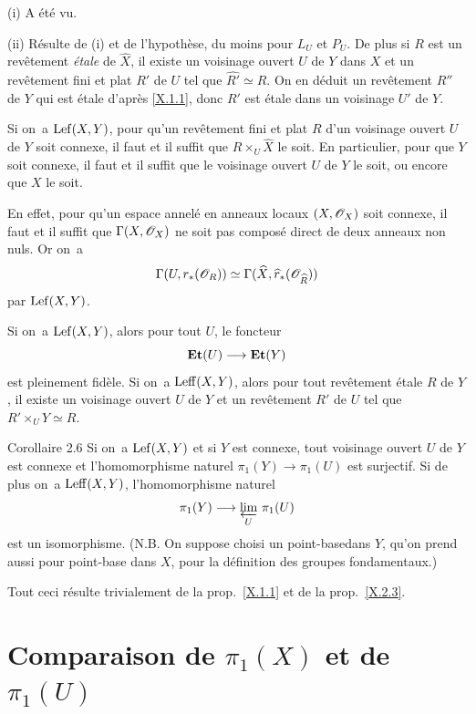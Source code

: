 (i) A \'et\'e vu.

(ii) R\'esulte de (i) et de l'hypoth\`ese, du moins pour $L_U$ et $P_U$. De plus si $R$ est un rev\^etement \emph{étale} de $\hat{X}$, il existe un voisinage ouvert $U$ de $Y$ dans $X$ et un rev\^etement fini et plat $R'$ de $U$ tel que $\widehat{R'} \simeq R$. On en d\'eduit un rev\^etement $R''$ de $Y$ qui est \'etale d'apr\`es \ref{X.1.1}, donc $R'$ est \'etale dans un voisinage $U'$ de $Y$. \cqfd

\begin{corollaire} \label{X.2.4}
Si on~a $\operatorname{Lef} (X, Y)$, pour qu'un rev\^etement fini et plat $R$ d'un voisinage ouvert $U$ de $Y$ soit connexe, il faut et il suffit que $R \times_U \hat{X}$ le soit. En particulier, pour que $Y$ soit connexe, il faut et il suffit que le voisinage ouvert $U$ de $Y$ le soit, ou encore que $X$ le soit.
\end{corollaire}

En effet, pour qu'un espace annel\'e en anneaux locaux $(X, \mathscr{O}_X)$ soit connexe, il faut et il suffit que $\Gamma(X, \mathscr{O}_X)$ ne soit pas compos\'e direct de deux anneaux non nuls. Or on~a
\[
\Gamma(U, r_\ast({\mathscr O}_R)) \simeq \Gamma(\widehat{X}, \widehat{r}_\ast({\mathscr O}_{\widehat{R}}))
\]
par $\operatorname{Lef}(X, Y)$.

\begin{corollaire} \label{X.2.5} Si on~a $\operatorname{Lef} (X, Y)$, alors pour tout $U$, le foncteur
\[
\Et(U) \to \Et(Y)
\]
est pleinement fid\`ele. Si on~a $\operatorname{Leff}(X, Y)$, alors pour tout rev\^etement \'etale $R$ de $Y$, il existe un voisinage ouvert $U$ de $Y$ et un rev\^etement $R'$ de $U$ tel que $R' \times_U Y \simeq R$.
\end{corollaire}

\label{X.2.6}
\begin{enonce*}{Corollaire 2.6\ndemark}
Si on~a $\operatorname{Lef}(X, Y)$ et si $Y$ est connexe, tout voisinage ouvert $U$ de $Y$ est connexe et l'homomorphisme naturel $\pi_1(Y)\to\pi_1(U)$ est surjectif. Si de plus on~a $\operatorname{Leff}(X, Y)$, l'homomorphisme naturel
\[
\pi_1(Y) \to \varprojlim_{U}\, \pi_1(U)
\]
est un isomorphisme. (N.B. On suppose choisi un \og point-base\fg dans $Y$, qu'on prend aussi pour point-base dans $X$, pour la d\'efinition des groupes fondamentaux.)
\end{enonce*}

Tout ceci r\'esulte trivialement de la prop.\, \ref{X.1.1} et de la prop.\, \ref{X.2.3}.


\section{Comparaison de $\pi_1(X)$ et de $\pi_1(U)$} \label{X.3}

